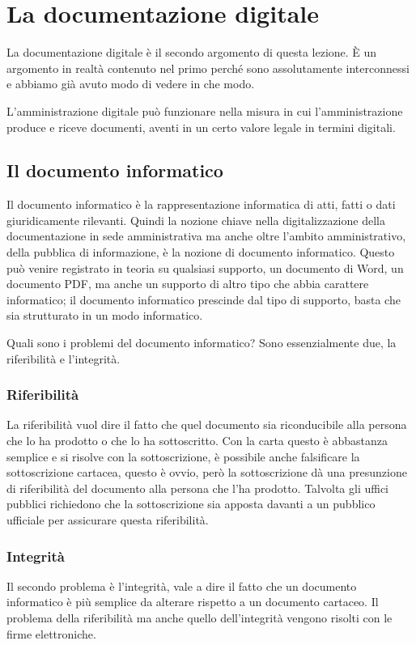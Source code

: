 \section{La documentazione digitale}
La documentazione digitale è il secondo argomento di questa lezione. È un argomento in realtà contenuto nel primo perché sono assolutamente interconnessi e abbiamo già avuto modo di vedere in che modo. 

L'amministrazione digitale può funzionare nella misura in cui l'amministrazione produce e riceve documenti, aventi in un certo valore legale in termini digitali. 

\subsection{Il documento informatico}
Il documento informatico è la rappresentazione informatica di atti, fatti o dati giuridicamente rilevanti. 
Quindi la nozione chiave nella digitalizzazione della documentazione in sede amministrativa ma anche oltre l'ambito amministrativo, della pubblica di informazione, è la nozione di documento informatico. 
Questo può venire registrato in teoria su qualsiasi supporto, un documento di Word, un documento PDF, ma anche un supporto di altro tipo che abbia carattere informatico; il documento informatico prescinde dal tipo di supporto, basta che sia strutturato in un modo informatico. 

Quali sono i problemi del documento informatico? Sono essenzialmente due, la riferibilità e l'integrità. 

\subsubsection{Riferibilità}
La riferibilità vuol dire il fatto che quel documento sia riconducibile alla persona che lo ha prodotto o che lo ha sottoscritto. Con la carta questo è abbastanza semplice e si risolve con la sottoscrizione, è possibile anche falsificare la sottoscrizione cartacea, questo è ovvio, però la sottoscrizione dà una presunzione di riferibilità del documento alla persona che l'ha prodotto. Talvolta gli uffici pubblici richiedono che la sottoscrizione sia apposta davanti a un pubblico ufficiale per assicurare questa riferibilità. 

\subsubsection{Integrità}
Il secondo problema è l'integrità, vale a dire il fatto che un documento informatico è più semplice da alterare rispetto a un documento cartaceo. Il problema della riferibilità ma anche quello dell'integrità vengono risolti con le firme elettroniche. 

